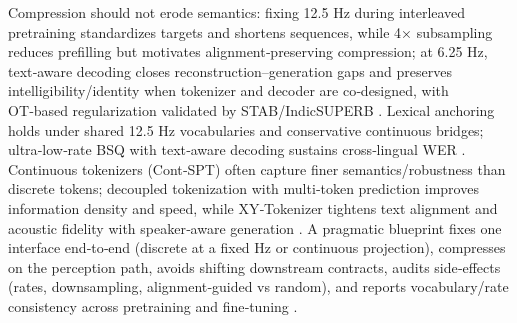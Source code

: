 Compression should not erode semantics: fixing 12.5 Hz during interleaved pretraining standardizes targets and shortens sequences, while 4× subsampling reduces prefilling but motivates alignment‑preserving compression; at 6.25 Hz, text‑aware decoding closes reconstruction–generation gaps and preserves intelligibility/identity when tokenizer and decoder are co‑designed, with OT‑based regularization validated by STAB/IndicSUPERB \cite{zeng2024scalingspeechtextpretrainingsyntheticint,wang2023slmbridgethingapbetweenspeechtextfoundat,wang2025tadicodectextawarediffusionspeechtokeniz,xu2025optimaltransportregularizationspeechtext,vashishth2024stabspeechtokenizerassessmentbenchmark,entry2025indicsuperbspeechprocessinguniversalperf}. Lexical anchoring holds under shared 12.5 Hz vocabularies and conservative continuous bridges; ultra‑low‑rate BSQ with text‑aware decoding sustains cross‑lingual WER \cite{zeng2024scalingspeechtextpretrainingsyntheticint,wang2023slmbridgethingapbetweenspeechtextfoundat,wang2025tadicodectextawarediffusionspeechtokeniz}. Continuous tokenizers (Cont‑SPT) often capture finer semantics/robustness than discrete tokens; decoupled tokenization with multi‑token prediction improves information density and speed, while XY‑Tokenizer tightens text alignment and acoustic fidelity with speaker‑aware generation \cite{li2025continuousspeechtokenizertext,gong2025xytokenizermitigatingsemanticacousticcon,fan2025whatmakesgoodspeechtokenizerllmcentricge,wang2024comparativestudydiscretespeechtokenssema}. A pragmatic blueprint fixes one interface end‑to‑end (discrete at a fixed Hz or continuous projection), compresses on the perception path, avoids shifting downstream contracts, audits side‑effects (rates, downsampling, alignment‑guided vs random), and reports vocabulary/rate consistency across pretraining and fine‑tuning \cite{turetzky2024lastlanguagemodelawarespeechtokenization,li2025continuousspeechtokenizertext,verma2024whispergpthybridrepresentationaudiolarge,wang2024c3llmconditionalmultimodalcontentgenerat}.

